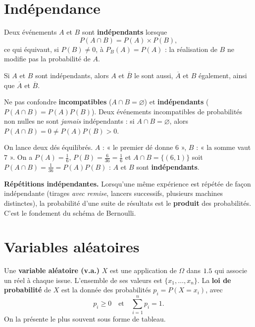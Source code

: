 \section{Indépendance}

\begin{definition}
Deux événements $A$ et $B$ sont \textbf{indépendants} lorsque
\[
P(A\cap B)=P(A)\times P(B),
\]
ce qui équivaut, si $P(B)\neq 0$, à $P_B(A)=P(A)$ : la réalisation de $B$ ne
modifie pas la probabilité de $A$.
\end{definition}

\begin{propriete}
Si $A$ et $B$ sont indépendants, alors $A$ et $\overline B$ le sont aussi,
$\overline A$ et $B$ également, ainsi que $\overline A$ et $\overline B$.
\end{propriete}

\begin{remarque}
Ne pas confondre \textbf{incompatibles} ($A\cap B=\varnothing$) et
\textbf{indépendants} ($P(A\cap B)=P(A)P(B)$). Deux événements incompatibles de
probabilités non nulles ne sont \emph{jamais} indépendants : si $A\cap
B=\varnothing$, alors $P(A\cap B)=0\ne P(A)P(B)>0$.
\end{remarque}

\begin{exemple}
On lance deux dés équilibrés. $A$ : « le premier dé donne $6$ », $B$ : « la somme
vaut $7$ ». On a $P(A)=\frac16$, $P(B)=\frac{6}{36}=\frac16$ et $A\cap B=\{(6,1)\}$
soit $P(A\cap B)=\frac1{36}=P(A)P(B)$ : $A$ et $B$ sont \textbf{indépendants}.
\end{exemple}

\begin{aretenir}
\textbf{Répétitions indépendantes.} Lorsqu'une même expérience est répétée de
façon indépendante (tirages \emph{avec remise}, lancers successifs, plusieurs
machines distinctes), la probabilité d'une suite de résultats est le
\textbf{produit} des probabilités. C'est le fondement du schéma de Bernoulli.
\end{aretenir}

\section{Variables aléatoires}

\begin{definition}
Une \textbf{variable aléatoire (v.a.)} $X$ est une application de $\Omega$ dans
$1.5$ qui associe un réel à chaque issue. L'ensemble de ses valeurs est
$\{x_1,\dots,x_n\}$. La \textbf{loi de probabilité} de $X$ est la donnée des
probabilités $p_i=P(X=x_i)$, avec
\[
p_i\ge 0 \quad\text{et}\quad \sum_{i=1}^{n}p_i=1.
\]
On la présente le plus souvent sous forme de tableau.
\end{definition}

